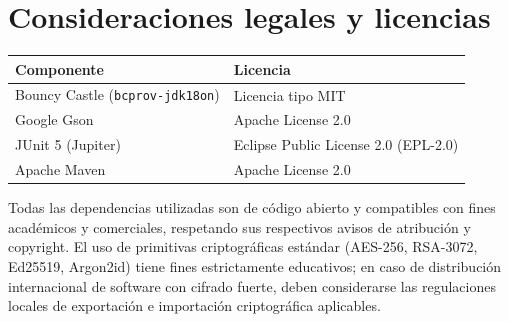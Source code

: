 \documentclass[11pt,a4paper]{article}
\begin{document}
\section{Consideraciones legales y licencias}
\begin{tabular}{@{}ll@{}}
\toprule
Componente & Licencia \\
\midrule
Bouncy Castle (\texttt{bcprov-jdk18on}) & Licencia tipo MIT \\
Google Gson & Apache License 2.0 \\
JUnit 5 (Jupiter) & Eclipse Public License 2.0 (EPL-2.0) \\
Apache Maven & Apache License 2.0 \\
\bottomrule
\end{tabular}

\bigskip
\noindent
Todas las dependencias utilizadas son de código abierto y compatibles con fines
académicos y comerciales, respetando sus respectivos avisos de atribución y
copyright. El uso de primitivas criptográficas estándar (AES-256, RSA-3072,
Ed25519, Argon2id) tiene fines estrictamente educativos; en caso de distribución
internacional de software con cifrado fuerte, deben considerarse las
regulaciones locales de exportación e importación criptográfica aplicables.
\end{document}
